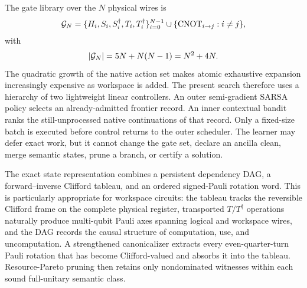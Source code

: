 The gate library over the $N$ physical wires is
\begin{equation}
\mathcal{G}_N=
\{H_i,S_i,S_i^\dagger,T_i,T_i^\dagger\}_{i=0}^{N-1}
\cup
\{\operatorname{CNOT}_{i\rightarrow j}:i\neq j\},
\label{eq:gate-library}
\end{equation}
with
\begin{equation}
|\mathcal{G}_N|=5N+N(N-1)=N^2+4N.
\label{eq:branching}
\end{equation}
The quadratic growth of the native action set makes atomic exhaustive expansion increasingly expensive as workspace is added. The present search therefore uses a hierarchy of two lightweight linear controllers. An outer semi-gradient SARSA policy selects an already-admitted frontier record. An inner contextual bandit ranks the still-unprocessed native continuations of that record. Only a fixed-size batch is executed before control returns to the outer scheduler. The learner may defer exact work, but it cannot change the gate set, declare an ancilla clean, merge semantic states, prune a branch, or certify a solution.

The exact state representation combines a persistent dependency DAG, a forward--inverse Clifford tableau, and an ordered signed-Pauli rotation word. This is particularly appropriate for workspace circuits: the tableau tracks the reversible Clifford frame on the complete physical register, transported $T/T^\dagger$ operations naturally produce multi-qubit Pauli axes spanning logical and workspace wires, and the DAG records the causal structure of computation, use, and uncomputation. A strengthened canonicalizer extracts every even-quarter-turn Pauli rotation that has become Clifford-valued and absorbs it into the tableau. Resource-Pareto pruning then retains only nondominated witnesses within each sound full-unitary semantic class.

